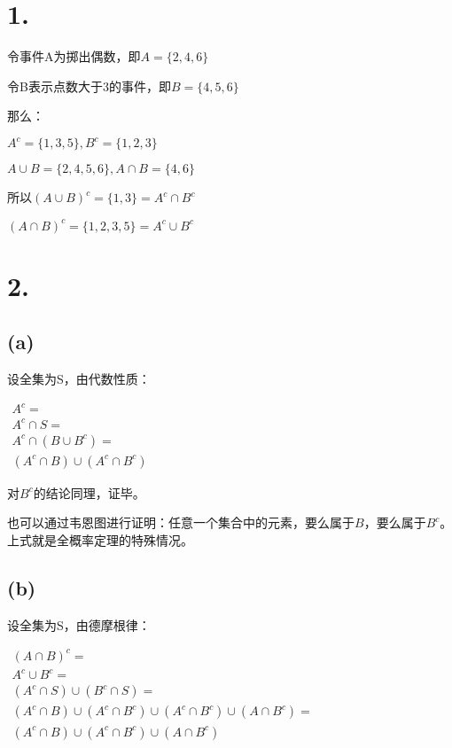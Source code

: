 \documentclass[UTF8]{article}
\begin{document}
    \section*{1.}
        令事件A为掷出偶数，即$A = \{2, 4, 6\}$
        
        令B表示点数大于3的事件，即$B = \{4, 5, 6\}$

        那么：

        $A^c = \{1, 3, 5\}, B^c = \{1, 2, 3\}$

        $A \cup B = \{2, 4, 5, 6\}, A \cap B = \{4, 6\}$

        所以$(A \cup B)^c = \{1, 3\} = A^c \cap B^c$
        
        $(A \cap B)^c = \{1, 2, 3, 5\} = A^c \cup B^c$
    \section*{2.}
        \subsection*{(a)}
            设全集为S，由代数性质：
            
            $\begin{array}{lcr}
                A^c = \\
            A^c \cap S = \\
            A^c \cap (B \cup B^c) = \\
            (A^c \cap B) \cup (A^c \cap B^c)
            \end{array}$

            对$B^c$的结论同理，证毕。

            也可以通过韦恩图进行证明：任意一个集合中的元素，要么属于$B$，要么属于$B^c$。上式就是全概率定理的特殊情况。
        \subsection*{(b)}
            设全集为S，由德摩根律：

            $\begin{array}{lcr}
                (A \cap B)^c = \\
                A^c \cup B^c = \\
                (A^c \cap S) \cup (B^c \cap S) = \\
                (A^c \cap B) \cup  (A^c \cap B^c) \cup (A^c \cap B^c) \cup (A \cap B^c) = \\
                (A^c \cap B) \cup  (A^c \cap B^c) \cup (A \cap B^c)
            \end{array}$
\end{document}
